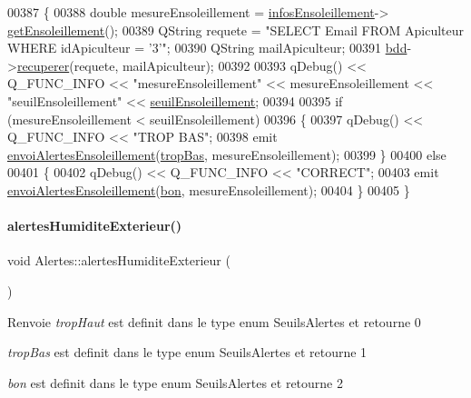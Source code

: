 \begin{DoxyCode}
00387 \{
00388     \textcolor{keywordtype}{double} mesureEnsoleillement = \hyperlink{class_alertes_abd9b6ff4e9f1df3c360374cceb8d0601}{infosEnsoleillement}->
      \hyperlink{class_infos_ensoleillement_a388dd7b2ae97839a779ca1384ca8e6e2}{getEnsoleillement}();
00389     QString requete = \textcolor{stringliteral}{"SELECT Email FROM Apiculteur WHERE idApiculteur = '3'"};
00390     QString mailApiculteur;
00391     \hyperlink{class_alertes_a91e58b69d29922e8e984efb767ae5268}{bdd}->\hyperlink{class_base_de_donnees_a77539baad389f5acf754cd2cd452403e}{recuperer}(requete, mailApiculteur);
00392 
00393     qDebug() << Q\_FUNC\_INFO << \textcolor{stringliteral}{"mesureEnsoleillement"} << mesureEnsoleillement << \textcolor{stringliteral}{"seuilEnsoleillement"} << 
      \hyperlink{class_alertes_a7f512b6d3b5bc0851757ab4d18279ccf}{seuilEnsoleillement};
00394 
00395     \textcolor{keywordflow}{if} (mesureEnsoleillement < seuilEnsoleillement)
00396     \{
00397         qDebug() << Q\_FUNC\_INFO << \textcolor{stringliteral}{"TROP BAS"};
00398         emit \hyperlink{class_alertes_a578aa70bc7ca4ec753aa7f97e90f7f02}{envoiAlertesEnsoleillement}(\hyperlink{parametres_8h_aaa6de8207c94675264c90b10b613368da4257e2f8921856770c8266f55c937295}{tropBas}, mesureEnsoleillement);
00399     \}
00400     \textcolor{keywordflow}{else}
00401     \{
00402         qDebug() << Q\_FUNC\_INFO << \textcolor{stringliteral}{"CORRECT"};
00403         emit \hyperlink{class_alertes_a578aa70bc7ca4ec753aa7f97e90f7f02}{envoiAlertesEnsoleillement}(\hyperlink{parametres_8h_aaa6de8207c94675264c90b10b613368da5ac8ec3b54d90a07c6bb5a77ef971821}{bon}, mesureEnsoleillement);
00404     \}
00405 \}
\end{DoxyCode}
\mbox{\label{class_alertes_a8606946eaa04dfd29bb7951b2b850a04}} 
\paragraph{\texorpdfstring{alertes\+Humidite\+Exterieur()}{alertesHumiditeExterieur()}}
{\footnotesize\ttfamily void Alertes\+::alertes\+Humidite\+Exterieur (\begin{DoxyParamCaption}{ }\end{DoxyParamCaption})}

\begin{DoxyReturn}{Renvoie}
{\itshape trop\+Haut} est definit dans le type enum Seuils\+Alertes et retourne 0 

{\itshape trop\+Bas} est definit dans le type enum Seuils\+Alertes et retourne 1 

{\itshape bon} est definit dans le type enum Seuils\+Alertes et retourne 2 
\end{DoxyReturn}


